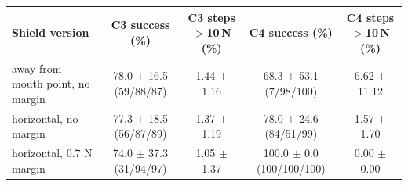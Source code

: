 \begin{tabular}{lcccc}
\toprule
Shield version & C3 success (\%) & C3 steps $>$10\,N (\%) & C4 success (\%) & C4 steps $>$10\,N (\%) \\
\midrule
away from mouth point, no margin & 78.0 $\pm$ 16.5 (59/88/87) & 1.44 $\pm$ 1.16 & 68.3 $\pm$ 53.1 (7/98/100) & 6.62 $\pm$ 11.12 \\
horizontal, no margin & 77.3 $\pm$ 18.5 (56/87/89) & 1.37 $\pm$ 1.19 & 78.0 $\pm$ 24.6 (84/51/99) & 1.57 $\pm$ 1.70 \\
horizontal, 0.7 N margin & 74.0 $\pm$ 37.3 (31/94/97) & 1.05 $\pm$ 1.37 & 100.0 $\pm$ 0.0 (100/100/100) & 0.00 $\pm$ 0.00 \\
\bottomrule
\end{tabular}
